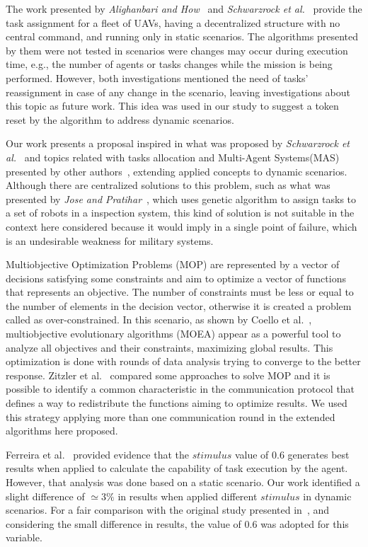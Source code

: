 The work presented by \textit{Alighanbari and How}~\cite{alighanbari2005decentralized} and \textit{Schwarzrock et al.}~\cite{MAS07} provide the task assignment for a fleet of UAVs, having a decentralized structure with no central command, and running only in static scenarios. The algorithms presented by them were not tested in scenarios were changes may occur during  execution time, e.g., the number of agents or tasks changes while the mission is being performed. However, both investigations mentioned the need of tasks' reassignment in case of any  change in the scenario, leaving investigations about this topic as future work. This idea was used in our study to suggest a token reset by the algorithm to address dynamic scenarios.

Our work presents a proposal inspired in what was proposed by \textit{Schwarzrock et al.}~\cite{MAS07} and topics related with tasks allocation and Multi-Agent Systems(MAS) presented by other authors~\cite{MAS01, MAS02, MAS03, MAS04, MAS05, MAS06}, extending applied concepts to dynamic scenarios. Although there are centralized solutions to this problem, such as what was presented by \textit{Jose and Pratihar}~\cite{jose2016task}, which uses genetic algorithm to assign tasks to a set of robots in a inspection system, this kind of solution is not suitable in the context here considered because it would imply in a single point of failure, which is an undesirable weakness for military systems.

Multiobjective Optimization Problems (MOP) are represented by a vector of decisions satisfying some constraints and aim to optimize a vector of functions that represents an objective. The number of constraints must be less or equal to the number of elements in the decision vector, otherwise it is created a problem called as over-constrained. In this scenario, as shown by Coello et al.~\cite{MOEA01},  multiobjective evolutionary algorithms (MOEA) appear as a powerful tool to analyze all objectives and their constraints, maximizing global results. This optimization is done with rounds of data analysis trying to converge to the better response. Zitzler et al.~\cite{07} compared some approaches to solve MOP and it is possible to identify a common characteristic in the communication protocol that defines a way to redistribute the functions aiming to optimize results. We used this strategy applying more than one communication round in the extended algorithms here proposed.

Ferreira et al.~\cite{ferreira2007swarm} provided evidence that the $stimulus$ value of $0.6$ generates best results when applied to calculate the capability of task execution by the agent. However, that analysis was done based on a static scenario. Our work identified a slight difference of $\simeq 3\%$ in results when applied different $stimulus$ in dynamic scenarios. For a fair comparison with the original study presented in~\cite{MAS07}, and considering the small difference in results, the value of $0.6$ was adopted for this variable.

